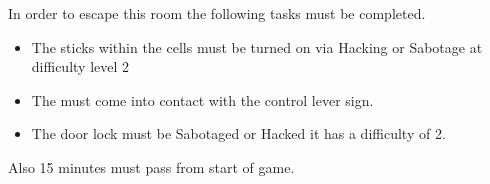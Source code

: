 \documentclass[green]{guildcamp4}
\begin{document}
\name{\gEscape{}}

In order to escape this room the following tasks must be completed.

\begin{itemize}
	\item The sticks within the cells must be turned on via Hacking or Sabotage at difficulty level 2
	\item The \iControlRod{} must come into contact with the control lever sign.
	\item The door lock must be Sabotaged or Hacked it has a difficulty of 2.
\end{itemize}

Also 15 minutes must pass from start of game.
\end{document}
